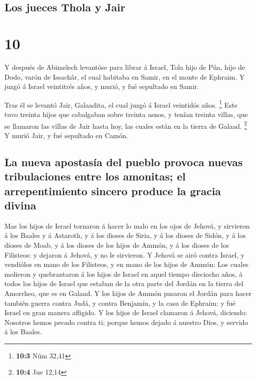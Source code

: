 \hypertarget{los-jueces-thola-y-jair}{%
\subsection{Los jueces Thola y Jair}\label{los-jueces-thola-y-jair}}

\hypertarget{section-9}{%
\section{10}\label{section-9}}

 Y después de Abimelech levantóse para librar á Israel, Tola
hijo de Púa, hijo de Dodo, varón de Issachâr, el cual habitaba en Samir,
en el monte de Ephraim.  Y juzgó á Israel veintitrés años, y
murió, y fué sepultado en Samir.

 Tras él se levantó Jair, Galaadita, el cual juzgó á Israel
veintidós años. \footnote{\textbf{10:3} Núm 32,41}  Este
tuvo treinta hijos que cabalgaban sobre treinta asnos, y tenían treinta
villas, que se llamaron las villas de Jair hasta hoy, las cuales están
en la tierra de Galaad. \footnote{\textbf{10:4} Jue 12,14} 
Y murió Jair, y fué sepultado en Camón.

\hypertarget{la-nueva-apostasuxeda-del-pueblo-provoca-nuevas-tribulaciones-entre-los-amonitas-el-arrepentimiento-sincero-produce-la-gracia-divina}{%
\subsection{La nueva apostasía del pueblo provoca nuevas tribulaciones
entre los amonitas; el arrepentimiento sincero produce la gracia
divina}\label{la-nueva-apostasuxeda-del-pueblo-provoca-nuevas-tribulaciones-entre-los-amonitas-el-arrepentimiento-sincero-produce-la-gracia-divina}}

 Mas los hijos de Israel tornaron á hacer lo malo en los
ojos de Jehová, y sirvieron á los Baales y á Astaroth, y á los dioses de
Siria, y á los dioses de Sidón, y á los dioses de Moab, y á los dioses
de los hijos de Ammón, y á los dioses de los Filisteos: y dejaron á
Jehová, y no le sirvieron.  Y Jehová se airó contra Israel,
y vendiólos en mano de los Filisteos, y en mano de los hijos de Ammón:
 Los cuales molieron y quebrantaron á los hijos de Israel en
aquel tiempo dieciocho años, á todos los hijos de Israel que estaban de
la otra parte del Jordán en la tierra del Amorrheo, que es en Galaad.
 Y los hijos de Ammón pasaron el Jordán para hacer también
guerra contra Judá, y contra Benjamín, y la casa de Ephraim: y fué
Israel en gran manera afligido.  Y los hijos de Israel
clamaron á Jehová, diciendo: Nosotros hemos pecado contra ti; porque
hemos dejado á nuestro Dios, y servido á los Baales.

